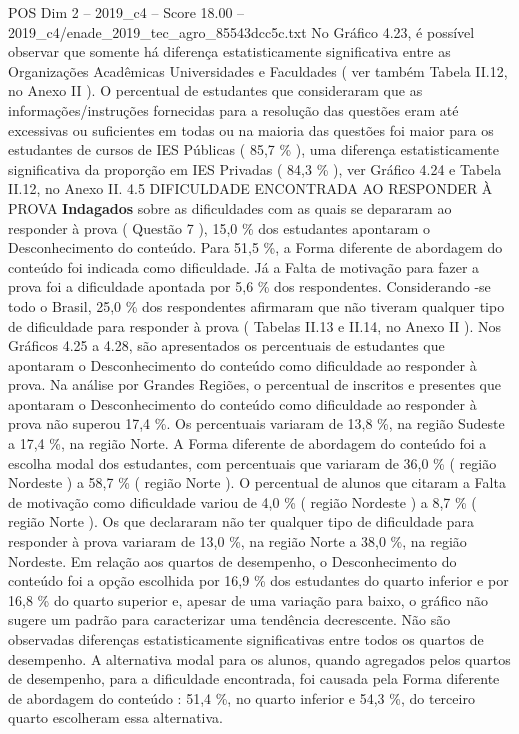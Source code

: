 \begin{textsample}{POS Dim 2 – 2019\_c4 – Score 18.00 – 2019\_c4/enade\_2019\_tec\_agro\_85543dcc5c.txt}
No Gráfico 4.23, é possível observar que somente há diferença estatisticamente significativa entre as Organizações Acadêmicas Universidades e Faculdades ( ver também Tabela II.12, no Anexo II ).
O percentual de estudantes que consideraram que as informações/instruções fornecidas para a resolução das questões eram até excessivas ou suficientes em todas ou na maioria das questões foi maior para os estudantes de cursos de IES Públicas ( 85,7 \% ), uma diferença estatisticamente significativa da proporção em IES Privadas ( 84,3 \% ), ver Gráfico 4.24 e Tabela II.12, no Anexo II. 4.5 DIFICULDADE ENCONTRADA AO RESPONDER À PROVA \textbf{Indagados} sobre as dificuldades com as quais se depararam ao responder à prova ( Questão 7 ), 15,0 \% dos estudantes apontaram o Desconhecimento do conteúdo.
Para 51,5 \%, a Forma diferente de abordagem do conteúdo foi indicada como dificuldade.
Já a Falta de motivação para fazer a prova foi a dificuldade apontada por 5,6 \% dos respondentes.
Considerando -se todo o Brasil, 25,0 \% dos respondentes afirmaram que não tiveram qualquer tipo de dificuldade para responder à prova ( Tabelas II.13 e II.14, no Anexo II ).
Nos Gráficos 4.25 a 4.28, são apresentados os percentuais de estudantes que apontaram o Desconhecimento do conteúdo como dificuldade ao responder à prova.
Na análise por Grandes Regiões, o percentual de inscritos e presentes que apontaram o Desconhecimento do conteúdo como dificuldade ao responder à prova não superou 17,4 \%.
Os percentuais variaram de 13,8 \%, na região Sudeste a 17,4 \%, na região Norte.
A Forma diferente de abordagem do conteúdo foi a escolha modal dos estudantes, com percentuais que variaram de 36,0 \% ( região Nordeste ) a 58,7 \% ( região Norte ).
O percentual de alunos que citaram a Falta de motivação como dificuldade variou de 4,0 \% ( região Nordeste ) a 8,7 \% ( região Norte ).
Os que declararam não ter qualquer tipo de dificuldade para responder à prova variaram de 13,0 \%, na região Norte a 38,0 \%, na região Nordeste.
Em relação aos quartos de desempenho, o Desconhecimento do conteúdo foi a opção escolhida por 16,9 \% dos estudantes do quarto inferior e por 16,8 \% do quarto superior e, apesar de uma variação para baixo, o gráfico não sugere um padrão para caracterizar uma tendência decrescente.
Não são observadas diferenças estatisticamente significativas entre todos os quartos de desempenho.
A alternativa modal para os alunos, quando agregados pelos quartos de desempenho, para a dificuldade encontrada, foi causada pela Forma diferente de abordagem do conteúdo : 51,4 \%, no quarto inferior e 54,3 \%, do terceiro quarto escolheram essa alternativa.

\end{textsample}
